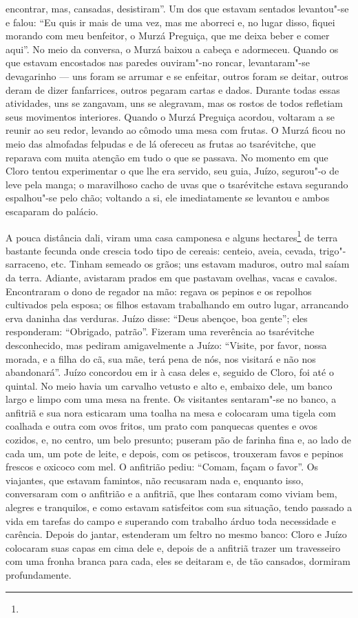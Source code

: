 encontrar, mas, cansadas, desistiram''. Um dos que estavam sentados
levantou"-se e falou: ``Eu quis ir mais de uma vez, mas me aborreci e, no
lugar disso, fiquei morando com meu benfeitor, o Murzá Preguiça, que me
deixa beber e comer aqui''. No meio da conversa, o Murzá baixou a cabeça
e adormeceu. Quando os que estavam encostados nas paredes ouviram"-no
roncar, levantaram"-se devagarinho --- uns foram se arrumar e se
enfeitar, outros foram se deitar, outros deram de dizer fanfarrices,
outros pegaram cartas e dados. Durante todas essas atividades, uns se
zangavam, uns se alegravam, mas os rostos de todos refletiam seus
movimentos interiores. Quando o Murzá Preguiça acordou, voltaram a se
reunir ao seu redor, levando ao cômodo uma mesa com frutas. O Murzá
ficou no meio das almofadas felpudas e de lá ofereceu as frutas ao
tsarévitche, que reparava com muita atenção em tudo o que se passava.
No momento em que Cloro tentou experimentar o que lhe era servido, seu guia, Juízo,
segurou"-o de leve pela manga; o maravilhoso cacho de uvas que o
tsarévitche estava segurando espalhou"-se pelo chão; voltando a si, ele
imediatamente se levantou e ambos escaparam do palácio.

A pouca distância dali, viram uma casa camponesa e alguns
hectares\footnote{} de terra
bastante fecunda onde crescia todo tipo de cereais: centeio, aveia,
cevada, trigo"-sarraceno, etc. Tinham semeado os grãos; uns estavam
maduros, outro mal saíam da terra. Adiante, avistaram prados em que
pastavam ovelhas, vacas e cavalos. Encontraram o dono de regador na mão:
regava os pepinos e os repolhos cultivados pela esposa; os filhos
estavam trabalhando em outro lugar, arrancando erva daninha das
verduras. Juízo disse: ``Deus abençoe, boa gente''; eles responderam:
``Obrigado, patrão''. Fizeram uma reverência ao tsarévitche
desconhecido, mas pediram amigavelmente a Juízo: ``Visite, por favor,
nossa morada, e a filha do cã, sua mãe, terá pena de nós, nos visitará e
não nos abandonará''. Juízo concordou em ir à casa deles e, seguido de
Cloro, foi até o quintal. No meio havia um carvalho vetusto e alto e,
embaixo dele, um banco largo e limpo com uma mesa na frente. Os
visitantes sentaram"-se no banco, a anfitriã e sua nora esticaram uma
toalha na mesa e colocaram uma tigela com coalhada e outra com ovos
fritos, um prato com panquecas quentes e ovos cozidos, e, no centro, um
belo presunto; puseram pão de farinha fina e, ao lado de cada um, um
pote de leite, e depois, com os petiscos, trouxeram favos e pepinos
frescos e oxicoco com mel. O anfitrião pediu: ``Comam, façam o favor''.
Os viajantes, que estavam famintos, não recusaram nada e, enquanto isso,
conversaram com o anfitrião e a anfitriã, que lhes contaram como viviam
bem, alegres e tranquilos, e como estavam satisfeitos com sua situação,
tendo passado a vida em tarefas do campo e superando com trabalho árduo
toda necessidade e carência. Depois do jantar, estenderam um feltro no
mesmo banco: Cloro e Juízo colocaram suas capas em cima dele e, depois de a anfitriã
trazer um travesseiro com uma fronha branca para cada, eles se deitaram
e, de tão cansados, dormiram profundamente.

